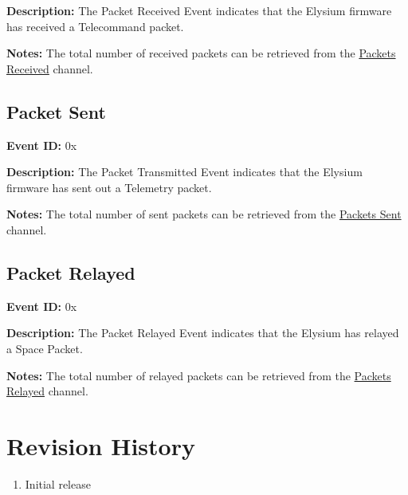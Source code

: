 \documentclass{hitec}
\newcounter{idval}
\newcommand*{\elyid}[0]{0x\padzeroes[2]\Hexadecimal{idval}\addtocounter{idval}{1}}
\let\oldaddcontentsline\addcontentsline
\newcommand{\starttocentries}{\let\addcontentsline\oldaddcontentsline}
\begin{document}
\noindent \textbf{Description:} The Packet Received Event indicates that the
Elysium firmware has received a Telecommand packet.

\noindent \textbf{Notes:} The total number of received packets can be retrieved
from the \hyperref[chan:spppktrecv]{Packets Received} channel.

\subsection{Packet Sent}
\label{evt:sppsent}

\noindent \textbf{Event ID:} \elyid 

\noindent \textbf{Description:} The Packet Transmitted Event indicates that the
Elysium firmware has sent out a Telemetry packet.

\noindent \textbf{Notes:} The total number of sent packets can be retrieved
from the \hyperref[chan:spppktsend]{Packets Sent} channel.

\subsection{Packet Relayed}
\label{evt:spprelay}

\noindent \textbf{Event ID:} \elyid 

\noindent \textbf{Description:} The Packet Relayed Event indicates that the
Elysium has relayed a Space Packet.

\noindent \textbf{Notes:} The total number of relayed packets can be retrieved
from the \hyperref[chan:spppktrelay]{Packets Relayed} channel.

\starttocentries

\appendix

\section{Revision History}

\begin{enumerate}
		\item Initial release
\end{enumerate}
\end{document}
